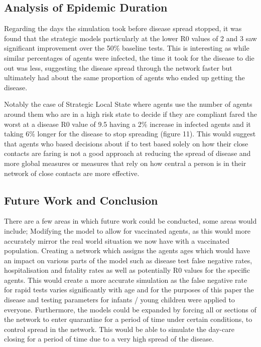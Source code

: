 \documentclass{article}
\begin{document}
\subsection{Analysis of Epidemic Duration}

Regarding the days the simulation took before disease spread stopped, it was found that the strategic models particularly at the lower R0 values of 2 and 3 saw significant improvement over the 50\% baseline tests. This is interesting as while similar percentages of agents were infected, the time it took for the disease to die out was less, suggesting the disease spread through the network faster but ultimately had about the same proportion of agents who ended up getting the disease.\newline 

Notably the case of Strategic Local State where agents use the number of agents around them who are in a high risk state to decide if they are compliant fared the worst at a disease R0 value of 9.5 having a 2\% increase in infected agents and it taking 6\% longer for the disease to stop spreading (figure 11). This would suggest that agents who based decisions about if to test based solely on how their close contacts are faring is not a good approach at reducing the spread of disease and more global measures or measures that rely on how central a person is in their network of close contacts are more effective. \newline 


\subsection{Future Work and Conclusion}

There are a few areas in which future work could be conducted, some areas would include; Modifying the model to allow for vaccinated agents, as this would more accurately mirror the real world situation we now have with a vaccinated population. Creating a network which assigns the agents ages which would have an impact on various parts of the model such as disease test false negative rates, hospitalisation and fatality rates as well as potentially R0 values for the specific agents. This would create a more accurate simulation as the false negative rate for rapid tests varies significantly with age and for the purposes of this paper the disease and testing parameters for infants / young children were applied to everyone. Furthermore, the models could be expanded by forcing all or sections of the network to enter quarantine for a period of time under certain conditions, to control spread in the network. This would be able to simulate the day-care closing for a period of time due to a very high spread of the disease. \newline 
\end{document}
